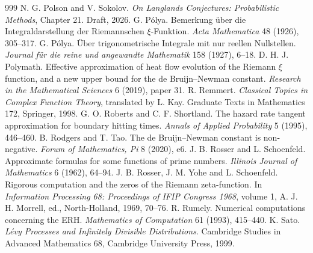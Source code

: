 \begin{thebibliography}{999}
 N. G. Polson and V. Sokolov. \emph{On Langlands Conjectures: Probabilistic Methods}, Chapter 21. Draft, 2026.
 G. P\'olya. Bemerkung \"uber die Integraldarstellung der Riemannschen $\xi$-Funktion. \emph{Acta Mathematica} 48 (1926), 305--317.
 G. P\'olya. \"Uber trigonometrische Integrale mit nur reellen Nullstellen. \emph{Journal f\"ur die reine und angewandte Mathematik} 158 (1927), 6--18.
 D. H. J. Polymath. Effective approximation of heat flow evolution of the Riemann $\xi$ function, and a new upper bound for the de Bruijn--Newman constant. \emph{Research in the Mathematical Sciences} 6 (2019), paper 31.
 R. Remmert. \emph{Classical Topics in Complex Function Theory}, translated by L. Kay. Graduate Texts in Mathematics 172, Springer, 1998.
 G. O. Roberts and C. F. Shortland. The hazard rate tangent approximation for boundary hitting times. \emph{Annals of Applied Probability} 5 (1995), 446--460.
 B. Rodgers and T. Tao. The de Bruijn--Newman constant is non-negative. \emph{Forum of Mathematics, Pi} 8 (2020), e6.
 J. B. Rosser and L. Schoenfeld. Approximate formulas for some functions of prime numbers. \emph{Illinois Journal of Mathematics} 6 (1962), 64--94.
 J. B. Rosser, J. M. Yohe and L. Schoenfeld. Rigorous computation and the zeros of the Riemann zeta-function. In \emph{Information Processing 68: Proceedings of IFIP Congress 1968}, volume 1, A. J. H. Morrell, ed., North-Holland, 1969, 70--76.
 R. Rumely. Numerical computations concerning the ERH. \emph{Mathematics of Computation} 61 (1993), 415--440.
 K. Sato. \emph{L\'evy Processes and Infinitely Divisible Distributions}. Cambridge Studies in Advanced Mathematics 68, Cambridge University Press, 1999.

\end{thebibliography}
